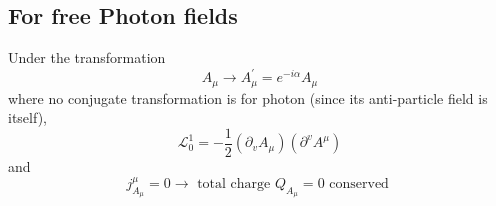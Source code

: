 \subsection{For free Photon fields}
Under the transformation
$$
A_{\mu} \rightarrow A_{\mu}^{\prime}=e^{-i \alpha} A_{\mu}
$$
where no conjugate transformation is for photon (since its anti-particle field is itself), 
$$
\mathcal{L}_{0}^{1}=-\frac{1}{2}\left(\partial_{v} A_{\mu}\right)\left(\partial^{v} A^{\mu}\right)
$$
and
$$
j_{A_{\mu}}^{\mu}=0 \rightarrow \text { total charge } Q_{A_{\mu}}=0 \text { conserved }
$$